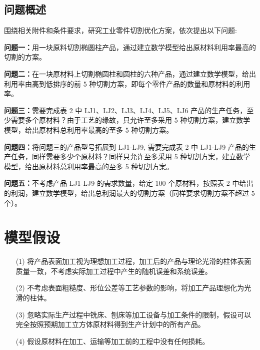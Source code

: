 \documentclass{whutmod}
\begin{document}
	
	
		\subsection{问题概述}
		    围绕相关附件和条件要求，研究工业零件切割优化方案，依次提出以下问题:
				 
			\textbf{问题一：}用一块原料切割椭圆柱产品，通过建立数学模型给出原材料利用率最高的切割的方案。
			
			\textbf{问题二：}在一块原材料上切割椭圆柱和圆柱的六种产品，通过建立数学模型，给出利用率由高到低排序的前 5 种切割方案，即每个零件产品的数量和原材料的利用率。
			
			\textbf{问题三：}需要完成表 2 中 LJ1、LJ2、LJ3、LJ4、LJ5、LJ6 产品的生产任务，至少需要多个原材料？由于工艺的缘故，只允许至多采用 5 种切割方案，建立数学模型，给出原材料总利用率最高的至多 5 种切割方案。

			\textbf{问题四：}将问题三的产品型号拓展到 LJ1-LJ9, 需要完成表 2 中 LJ1-LJ9 产品的生产任务，同样需要多少个原材料？同样只允许至多采用 5 种切割方案，建立数学模型，给出原材料总利用率最高的至多 5 种切割方案。
				
			\textbf{问题五：}不考虑产品 LJ1-LJ9 的需求数量，给定 100 个原材料，按照表 2 中给出的利润，建立数学模型，给出总利润最大的切割方案（同样要求切割方案不超过 5 个）。
	
	\section{模型假设}
		\begin{itemize}                                             
		\item [(1)]将产品表面加工视为理想加工过程，加工后的产品与理论光滑的柱体表面质量一致，不考虑实际加工过程中产生的随机误差和系统误差。
		\item [(2)]不考虑表面粗糙度、形位公差等工艺参数的影响，将加工产品理想化为光滑的柱体。
		\item [(3)]忽略实际生产过程中铣床、刨床等加工设备与加工条件的限制，假设可以完全按照预期加工立方体原材料得到生产计划中的所有产品。
		\item [(4)]假设原材料在加工、运输等加工前的工程中没有任何损耗。
		\end{itemize}

		
\end{document}
